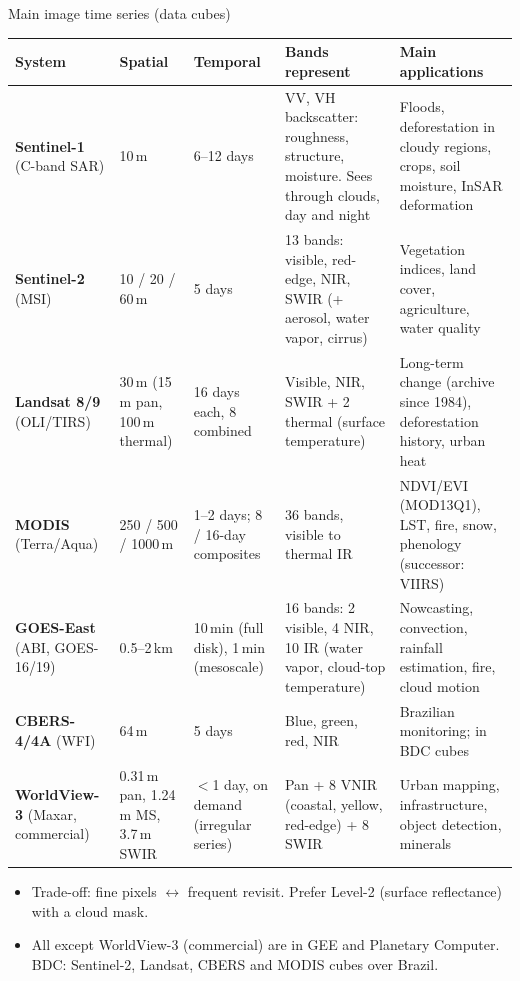 \documentclass{beamer}
\begin{document}
\begin{frame}{Main image time series (data cubes)}
    \centering
    \tiny
    \renewcommand{\arraystretch}{1.05}
    \begin{tabularx}{\textwidth}{@{}>{\raggedright}p{1.5cm} >{\raggedright}p{1.6cm} >{\raggedright}p{1.7cm} >{\raggedright}X >{\raggedright\arraybackslash}X@{}}
        \toprule
        \textbf{System} & \textbf{Spatial} & \textbf{Temporal} & \textbf{Bands represent} & \textbf{Main applications} \\
        \midrule
        \textbf{Sentinel-1} {\tiny (C-band SAR)} & 10\,m & 6--12 days & VV, VH backscatter: roughness, structure, moisture. Sees through clouds, day and night & Floods, deforestation in cloudy regions, crops, soil moisture, InSAR deformation \\
        \textbf{Sentinel-2} {\tiny (MSI)} & 10 / 20 / 60\,m & 5 days & 13 bands: visible, red-edge, NIR, SWIR (+ aerosol, water vapor, cirrus) & Vegetation indices, land cover, agriculture, water quality \\
        \textbf{Landsat 8/9} {\tiny (OLI/TIRS)} & 30\,m {\tiny (15\,m pan, 100\,m thermal)} & 16 days each, 8 combined & Visible, NIR, SWIR + 2 thermal (surface temperature) & Long-term change (archive since 1984), deforestation history, urban heat \\
        \textbf{MODIS} {\tiny (Terra/Aqua)} & 250 / 500 / 1000\,m & 1--2 days; 8 / 16-day composites & 36 bands, visible to thermal IR & NDVI/EVI (MOD13Q1), LST, fire, snow, phenology {\tiny (successor: VIIRS)} \\
        \textbf{GOES-East} {\tiny (ABI, GOES-16/19)} & 0.5--2\,km & 10\,min {\tiny (full disk)}, 1\,min {\tiny (mesoscale)} & 16 bands: 2 visible, 4 NIR, 10 IR (water vapor, cloud-top temperature) & Nowcasting, convection, rainfall estimation, fire, cloud motion \\
        \textbf{CBERS-4/4A} {\tiny (WFI)} & 64\,m & 5 days & Blue, green, red, NIR & Brazilian monitoring; in BDC cubes \\
        \textbf{WorldView-3} {\tiny (Maxar, commercial)} & 0.31\,m pan, 1.24\,m MS, 3.7\,m SWIR & $<$1 day, on demand {\tiny (irregular series)} & Pan + 8 VNIR (coastal, yellow, red-edge) + 8 SWIR & Urban mapping, infrastructure, object detection, minerals \\
        \bottomrule
    \end{tabularx}

    \vspace{0.05cm}
    \raggedright
    \tiny
    \begin{itemize}
        \item Trade-off: fine pixels $\leftrightarrow$ frequent revisit. Prefer Level-2 (surface reflectance) with a cloud mask.
        \item All except WorldView-3 (commercial) are in GEE and Planetary Computer. BDC: Sentinel-2, Landsat, CBERS and MODIS cubes over Brazil.
    \end{itemize}
\end{frame}
\end{document}
